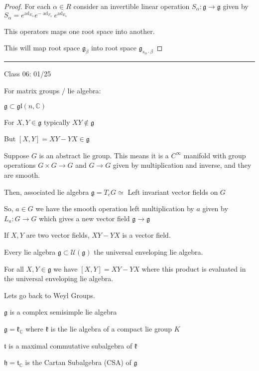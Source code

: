 \documentclass{article}
\theoremstyle{definition}
\newcommand{\ad}{\operatorname{ad}}
\begin{document}
\begin{proof}

    For each \(\alpha \in R\) consider an invertible linear operation \(S_\alpha : \mathfrak{g} \to \mathfrak{g} \) given by \(S_\alpha=e^{\ad_{E_\alpha}}e^{-\ad_{F_\alpha }}e^{\ad_{E_\alpha }}\)  

    This operators maps one root space into another.

    This will map root space \(\mathfrak{g}_\beta \) into root space \(\mathfrak{g}_{s_\alpha \cdot \beta} \)  

\end{proof}

\hfil
\hrule

Class 06: 01/25

For matrix groups / lie algebra:

\(\mathfrak{g} \subset \mathfrak{gl} (n,\mathbb{C})\) 

For \(X,Y\in \mathfrak{g} \) typically \(XY\notin \mathfrak{g} \) 

But \([X,Y]=XY-YX\in \mathfrak{g} \) 

Suppose \(G\) is an abstract lie group. This means it is a \(C^{\infty}\) manifold with group operations \(G\times G\to G\) and \(G\to G\) given by multiplication and inverse, and they are smooth.

Then, associated lie algebra \(\mathfrak{g} = T_e G \simeq \) Left invariant vector fields on \(G\) 

So, \(a\in G\) we have the smooth operation left multiplication by \(a\) given by \(L_a:G\to G\) which gives a new vector field \(\mathfrak{g}\to \mathfrak{g}\)

If \(X,Y\) are two vector fields, \(XY-YX\) is a vector field.

Every lie algebra \(\mathfrak{g} \subset \mathcal{U}(\mathfrak{g} )\) the universal enveloping lie algebra.

For all \(X,Y\in \mathfrak{g} \) we have \([X,Y]=XY-YX\) where this product is evaluated in the universal enveloping lie algebra.

Lets go back to Weyl Groups.

\(\mathfrak{g} \) is a complex semisimple lie algebra

\(\mathfrak{g=\mathfrak{k} _\mathbb{C}}\) where \(\mathfrak{k} \) is the lie algebra of a compact lie group \(K\) 

\(\mathfrak{t} \) is a maximal commutative subalgebra of \(\mathfrak{k} \) 

\(\mathfrak{h} = \mathfrak{t} _\mathbb{C} \) is the Cartan Subalgebra (CSA) of \(\mathfrak{g} \) 
\end{document}
